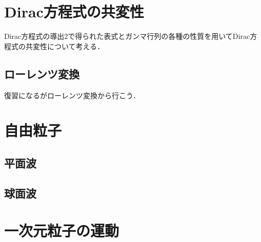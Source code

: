 \documentclass[a4j]{jarticle}
\begin{document}
\section{Dirac方程式の共変性}
Dirac方程式の導出2で得られた表式とガンマ行列の各種の性質を用いてDirac方程式の共変性について考える．
  \subsection{ローレンツ変換}
  復習になるがローレンツ変換から行こう．



\section{自由粒子}
\subsection{平面波}
\subsection{球面波}

\section{一次元粒子の運動}
\end{document}
